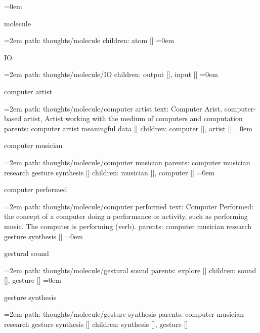 \smallskip
\leftskip=0em
\par\endgroup
\bigskip
{}
molecule
\smallskip
\par\begingroup
\leftskip=2em
path: thoughts/molecule
\smallskip
children: atom []
\smallskip
\leftskip=0em
\par\endgroup
\bigskip
{}
IO
\smallskip
\par\begingroup
\leftskip=2em
path: thoughts/molecule/IO
\smallskip
children: output [], input []
\smallskip
\leftskip=0em
\par\endgroup
\bigskip
{}
computer artist
\smallskip
\par\begingroup
\leftskip=2em
path: thoughts/molecule/computer artist
\smallskip
text:  Computer Arist, computer-based artist, Artist working with the medium of computers and computation
\smallskip
parents:  computer artist meaningful data []
\smallskip
children: computer [], artist []
\smallskip
\leftskip=0em
\par\endgroup
\bigskip
{}
computer musician
\smallskip
\par\begingroup
\leftskip=2em
path: thoughts/molecule/computer musician
\smallskip
parents:  computer musician research gesture synthesis []
\smallskip
children: musician [], computer []
\smallskip
\leftskip=0em
\par\endgroup
\bigskip
{}
computer performed
\smallskip
\par\begingroup
\leftskip=2em
path: thoughts/molecule/computer performed
\smallskip
text:  Computer Performed: the concept of a computer doing a performance or activity, such as performing music. The computer is performing (verb).
\smallskip
parents:  computer musician research gesture synthesis []
\smallskip
\leftskip=0em
\par\endgroup
\bigskip
{}
gestural sound
\smallskip
\par\begingroup
\leftskip=2em
path: thoughts/molecule/gestural sound
\smallskip
parents:  explore []
\smallskip
children: sound [], gesture []
\smallskip
\leftskip=0em
\par\endgroup
\bigskip
{}
gesture synthesis
\smallskip
\par\begingroup
\leftskip=2em
path: thoughts/molecule/gesture synthesis
\smallskip
parents:  computer musician research gesture synthesis []
\smallskip
children: synthesis [], gesture []
